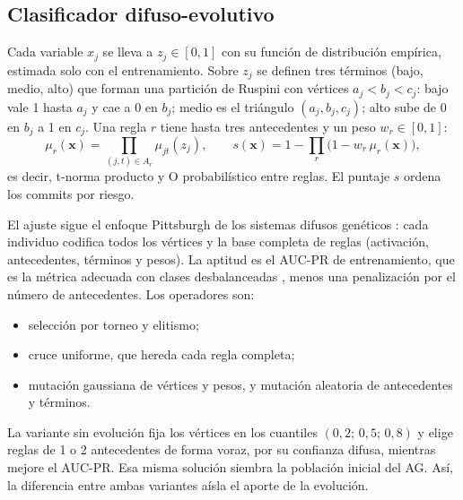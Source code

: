 \subsection{Clasificador difuso-evolutivo}

Cada variable $x_j$ se lleva a $z_j\in[0,1]$ con su función de distribución empírica, estimada solo con el entrenamiento. Sobre $z_j$ se definen tres términos (bajo, medio, alto) que forman una partición de Ruspini \cite{Ruspini1969} con vértices $a_j<b_j<c_j$: bajo vale 1 hasta $a_j$ y cae a 0 en $b_j$; medio es el triángulo $(a_j,b_j,c_j)$; alto sube de 0 en $b_j$ a 1 en $c_j$. Una regla $r$ tiene hasta tres antecedentes y un peso $w_r\in[0,1]$:
\begin{equation}
\mu_r(\mathbf{x})=\prod_{(j,t)\in A_r}\mu_{jt}(z_j),\qquad
s(\mathbf{x})=1-\prod_{r}\bigl(1-w_r\,\mu_r(\mathbf{x})\bigr),
\end{equation}
es decir, t-norma producto y O probabilístico entre reglas. El puntaje $s$ ordena los commits por riesgo.

El ajuste sigue el enfoque Pittsburgh de los sistemas difusos genéticos \cite{Herrera2008,Ishibuchi2001}: cada individuo codifica todos los vértices y la base completa de reglas (activación, antecedentes, términos y pesos). La aptitud es el AUC-PR de entrenamiento, que es la métrica adecuada con clases desbalanceadas \cite{Saito2015}, menos una penalización por el número de antecedentes. Los operadores son:
\begin{itemize}
\item selección por torneo y elitismo;
\item cruce uniforme, que hereda cada regla completa;
\item mutación gaussiana de vértices y pesos, y mutación aleatoria de antecedentes y términos.
\end{itemize}

La variante sin evolución fija los vértices en los cuantiles $(0{,}2;\,0{,}5;\,0{,}8)$ y elige reglas de 1 o 2 antecedentes de forma voraz, por su confianza difusa, mientras mejore el AUC-PR. Esa misma solución siembra la población inicial del AG. Así, la diferencia entre ambas variantes aísla el aporte de la evolución.

